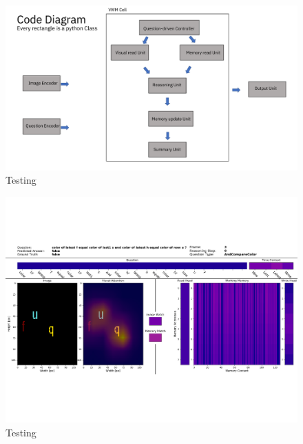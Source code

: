 \documentclass{article}
\theoremstyle{remark}
\theoremstyle{definition}
\begin{document}
\begin{figure}[b]
	\centering
	\includegraphics[width=\textwidth]{img/model}
	\caption{Testing}
	\label{fig:model}
\end{figure}


\begin{figure}[ht]
	\centering
	\includegraphics[width=\textwidth]{img/visualization}
	\caption{Testing}
	\label{fig:visualization}
\end{figure}



\newpage

\end{document}
